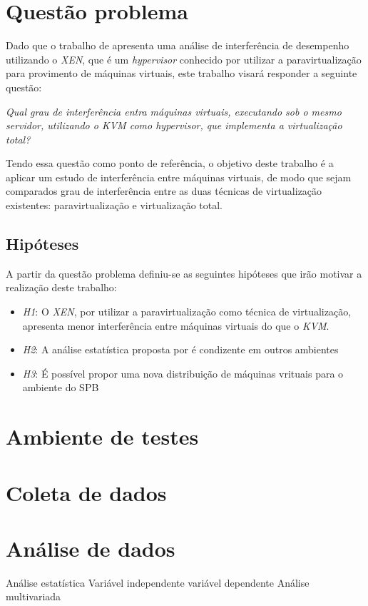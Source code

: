 \section{Questão problema}
Dado que o trabalho de  apresenta uma análise de interferência de desempenho utilizando o \textit{XEN}, que é um \textit{hypervisor} conhecido por utilizar a paravirtualização para provimento de máquinas virtuais, este trabalho visará responder a seguinte questão:

\textit{ Qual  grau de interferência entra máquinas virtuais, executando sob o mesmo servidor, utilizando o \textit{KVM} como \textit{hypervisor}, que implementa a virtualização total?  }
 
Tendo essa questão como ponto de referência, o objetivo deste trabalho é a aplicar um estudo de interferência entre máquinas virtuais, de modo que sejam comparados grau de interferência entre as duas técnicas de virtualização existentes: paravirtualização e virtualização total.
\subsection{Hipóteses}
A partir da questão problema definiu-se as seguintes hipóteses que irão motivar a realização deste trabalho:

\begin{itemize}
	\item \textit{H1}: O \textit{XEN}, por utilizar a paravirtualização como técnica de virtualização, apresenta menor interferência entre máquinas virtuais do que o \textit{KVM}.
	\item \textit{H2}: A análise estatística proposta por  é condizente em outros ambientes %
	\item \textit{H3}: É possível propor uma nova distribuição de máquinas vrituais para o ambiente do SPB %
\end{itemize}
	
\section{Ambiente de testes}

\section{Coleta de dados}

\section{Análise de dados}
Análise estatística
Variável independente
variável dependente
Análise multivariada
 	